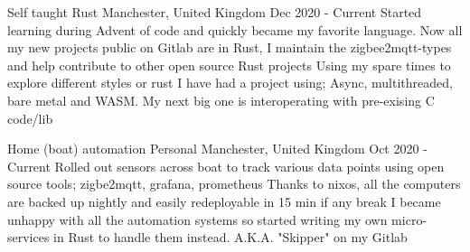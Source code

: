 \documentclass{my_cv}
\begin{document}
\experianceDetails
{Self taught}
{Rust}
{}
{Manchester, United Kingdom}
{Dec 2020 - Current}
\workdetails
{Started learning during Advent of code and quickly became my favorite language. Now all my new projects public on Gitlab are in Rust, I maintain the zigbee2mqtt-types and help contribute to other open source Rust projects}
{Using my spare times to explore different styles or rust I have had a project using; Async, multithreaded, bare metal and WASM. My next big one is interoperating with pre-exising C code/lib }
\stopworkdetails


\experianceDetails
{Home (boat) automation}
{Personal}
{}
{Manchester, United Kingdom}
{Oct 2020 - Current}
\workdetails
{Rolled out sensors across boat to track various data points using open source tools; zigbe2mqtt, grafana, prometheus}
{Thanks to nixos, all the computers are backed up nightly and easily redeployable in 15 min if any break}
{I became unhappy with all the automation systems so started writing my own micro-services in Rust to handle them instead. A.K.A. "Skipper" on my Gitlab}
\stopworkdetails





\end{document}
